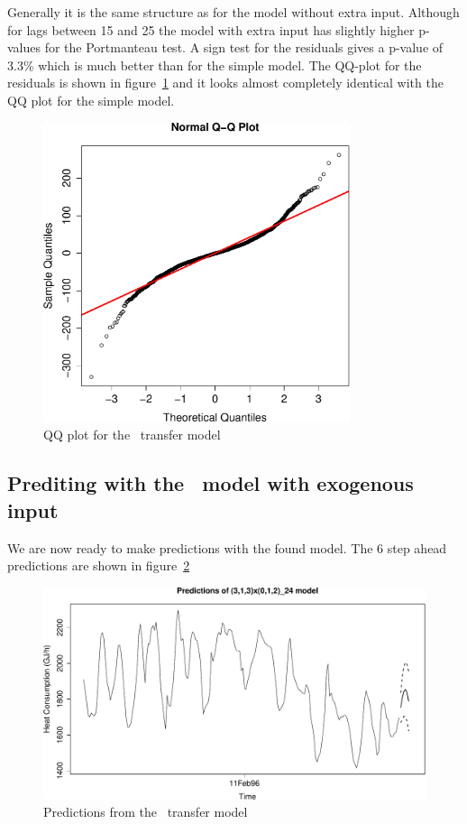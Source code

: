 Generally it is the same structure as for the model without extra input. Although for lags between 15 and 25 the model with extra input has slightly higher p-values for the Portmanteau test. A sign test for the residuals gives a p-value of 3.3\% which is much better than for the simple model. The QQ-plot for the residuals is shown in figure~\ref{fig:tfm2-qq} and it looks almost completely identical with the QQ plot for the simple model.

\begin{figure}[!ht]
    \centering
    \includegraphics[width=90mm]{../plots/tfm2-qq.pdf}
    \caption{QQ plot for the \tfmtwo\ transfer model}
    \label{fig:tfm2-qq}
\end{figure}

\FloatBarrier

\subsection*{Prediting with the \tfmtwo\ model with exogenous input}

We are now ready to make predictions with the found model. The 6 step ahead predictions are shown in figure~\ref{fig:tfm2-predictions}

\begin{figure}[!ht]
    \centering
    \includegraphics[width=120mm]{../plots/tfm2-predictions.pdf}
    \caption{Predictions from the \tfmtwo\ transfer model}
    \label{fig:tfm2-predictions}
\end{figure}


